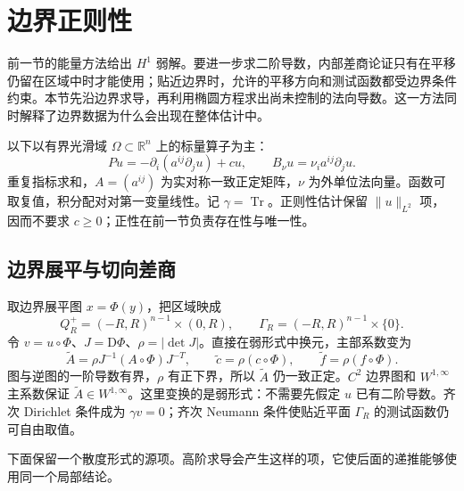
% 
% 

\section{边界正则性}
\label{g3:sec:1402}

前一节的能量方法给出 \(H^1\) 弱解。要进一步求二阶导数，内部差商论证只有在平移仍留在区域中时才能使用；贴近边界时，允许的平移方向和测试函数都受边界条件约束。本节先沿边界求导，再利用椭圆方程求出尚未控制的法向导数。这一方法同时解释了边界数据为什么会出现在整体估计中。

以下以有界光滑域 \(\Omega\subset\mathbb R^n\) 上的标量算子为主：
\[
	Pu=-\partial_i(a^{ij}\partial_j u)+cu,\qquad
	B_\nu u=\nu_i a^{ij}\partial_j u.
\]
重复指标求和，\(A=(a^{ij})\) 为实对称一致正定矩阵，\(\nu\) 为外单位法向量。函数可取复值，积分配对对第一变量线性。记 \(\gamma=\operatorname{Tr}\)。正则性估计保留 \(\|u\|_{L^2}\) 项，因而不要求 \(c\ge0\)；正性在前一节负责存在性与唯一性。

\subsection{边界展平与切向差商}
\label{g3:subsec:1402:01}
取边界展平图 \(x=\Phi(y)\)，把区域映成
\[
	Q_R^+=(-R,R)^{n-1}\times(0,R),\qquad
	\Gamma_R=(-R,R)^{n-1}\times\{0\}.
\]
令 \(v=u\circ\Phi\)、\(J=\mathrm D\Phi\)、\(\rho=|\det J|\)。直接在弱形式中换元，主部系数变为
\begin{equation}\label{g3:eq:boundary-flattened-coefficients}
	\widetilde A=\rho J^{-1}(A\circ\Phi)J^{-T},\qquad
	\widetilde c=\rho(c\circ\Phi),\qquad
	\widetilde f=\rho(f\circ\Phi).
\end{equation}
图与逆图的一阶导数有界，\(\rho\) 有正下界，所以 \(\widetilde A\) 仍一致正定。\(C^2\) 边界图和 \(W^{1,\infty}\) 主系数保证 \(\widetilde A\in W^{1,\infty}\)。这里变换的是弱形式：不需要先假定 \(u\) 已有二阶导数。齐次 Dirichlet 条件成为 \(\gamma v=0\)；齐次 Neumann 条件使贴近平面 \(\Gamma_R\) 的测试函数仍可自由取值。

下面保留一个散度形式的源项。高阶求导会产生这样的项，它使后面的递推能够使用同一个局部结论。

